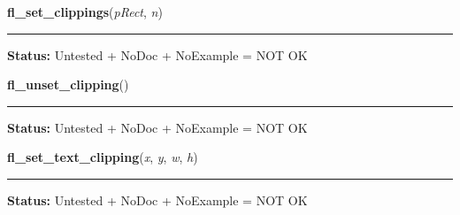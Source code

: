     \label{xformslib:library:fl_set_clippings}

    \vspace{0.5ex}

\hspace{.8\funcindent}\begin{boxedminipage}{\funcwidth}

    \raggedright \textbf{fl\_set\_clippings}(\textit{pRect}, \textit{n})

    \vspace{-1.5ex}

    \rule{\textwidth}{0.5\fboxrule}
\setlength{\parskip}{2ex}
\setlength{\parskip}{1ex}
\textbf{Status:} Untested + NoDoc + NoExample = NOT OK



    \end{boxedminipage}

    \label{xformslib:library:fl_unset_clipping}

    \vspace{0.5ex}

\hspace{.8\funcindent}\begin{boxedminipage}{\funcwidth}

    \raggedright \textbf{fl\_unset\_clipping}()

    \vspace{-1.5ex}

    \rule{\textwidth}{0.5\fboxrule}
\setlength{\parskip}{2ex}
\setlength{\parskip}{1ex}
\textbf{Status:} Untested + NoDoc + NoExample = NOT OK



    \end{boxedminipage}

    \label{xformslib:library:fl_set_text_clipping}

    \vspace{0.5ex}

\hspace{.8\funcindent}\begin{boxedminipage}{\funcwidth}

    \raggedright \textbf{fl\_set\_text\_clipping}(\textit{x}, \textit{y}, \textit{w}, \textit{h})

    \vspace{-1.5ex}

    \rule{\textwidth}{0.5\fboxrule}
\setlength{\parskip}{2ex}
\setlength{\parskip}{1ex}
\textbf{Status:} Untested + NoDoc + NoExample = NOT OK



    \end{boxedminipage}

